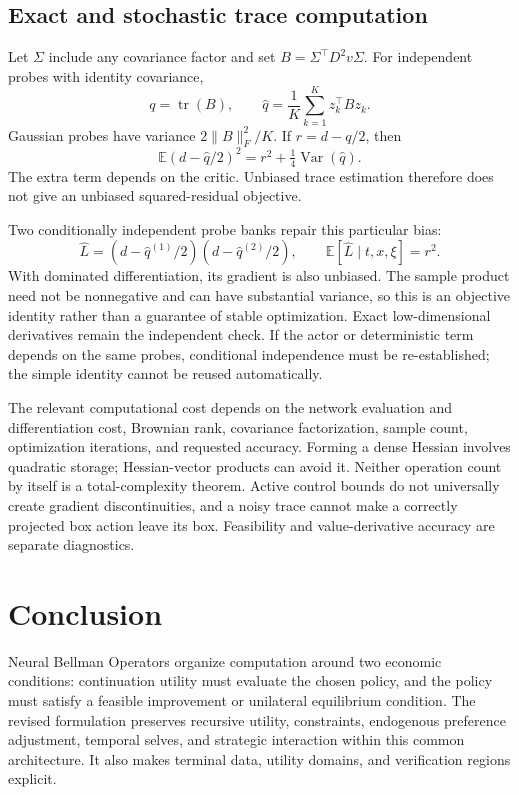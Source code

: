 \documentclass[ecta,draft]{econsocart}
\theoremstyle{definition}
\theoremstyle{remark}
\newcommand{\E}{\mathbb E}
\newcommand{\tr}{\operatorname{tr}}
\begin{document}


\subsection{Exact and stochastic trace computation}
Let $\Sigma$ include any covariance factor and set $B=\Sigma^\top D^2v\Sigma$. For independent probes with identity covariance,
\begin{equation}\label{eq:trace}
 q=\tr(B),\qquad \widehat q=\frac1K\sum_{k=1}^Kz_k^\top Bz_k.
\end{equation}
Gaussian probes have variance $2\|B\|_F^2/K$. If $r=d-q/2$, then
\begin{equation}\label{eq:tracebias}
 \E(d-\widehat q/2)^2=r^2+\tfrac14\operatorname{Var}(\widehat q).
\end{equation}
The extra term depends on the critic. Unbiased trace estimation therefore does not give an unbiased squared-residual objective.

Two conditionally independent probe banks repair this particular bias:
\begin{equation}\label{eq:crossprobe}
 \widehat L=(d-\widehat q^{(1)}/2)(d-\widehat q^{(2)}/2),
 \qquad\E[\widehat L\mid t,x,\xi]=r^2.
\end{equation}
With dominated differentiation, its gradient is also unbiased. The sample product need not be nonnegative and can have substantial variance, so this is an objective identity rather than a guarantee of stable optimization. Exact low-dimensional derivatives remain the independent check. If the actor or deterministic term depends on the same probes, conditional independence must be re-established; the simple identity cannot be reused automatically.

The relevant computational cost depends on the network evaluation and differentiation cost, Brownian rank, covariance factorization, sample count, optimization iterations, and requested accuracy. Forming a dense Hessian involves quadratic storage; Hessian-vector products can avoid it. Neither operation count by itself is a total-complexity theorem. Active control bounds do not universally create gradient discontinuities, and a noisy trace cannot make a correctly projected box action leave its box. Feasibility and value-derivative accuracy are separate diagnostics.



\section{Conclusion}\label{sec:conclusion}
Neural Bellman Operators organize computation around two economic conditions: continuation utility must evaluate the chosen policy, and the policy must satisfy a feasible improvement or unilateral equilibrium condition. The revised formulation preserves recursive utility, constraints, endogenous preference adjustment, temporal selves, and strategic interaction within this common architecture. It also makes terminal data, utility domains, and verification regions explicit.
\end{document}
